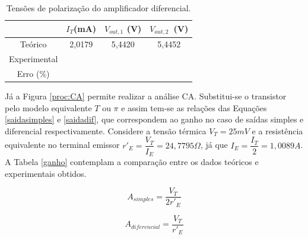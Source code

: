 \documentclass[a4paper,12pt,oneside,openany,table,xcdraw]{article}
\begin{document}
\vspace{0.3cm}
\begin{table} [H]
\centering
\def\arraystretch{1.38}
\caption{Tensões de polarização do amplificador diferencial. } \label{dados}
\begin{tabular}{|c|c|c|c|} 
\hhline{~---|}
\multicolumn{1}{c|}{}                            & {\cellcolor[rgb]{0.937,0.937,0.937}}\textbf{$I_{T}$(mA)} & {\cellcolor[rgb]{0.937,0.937,0.937}}\textbf{$V_{out, 1}$ (V)} & {\cellcolor[rgb]{0.937,0.937,0.937}}\textbf{$V_{out, 2}$~(V)}  \\ 
\hline
{\cellcolor[rgb]{0.937,0.937,0.937}}Teórico      & 2,0179                                                   & 5,4420                                                        & 5,4452                                                         \\ 
\hline
{\cellcolor[rgb]{0.937,0.937,0.937}}Experimental &                                                          &                                                               &                                                                \\ 
\hline
{\cellcolor[rgb]{0.937,0.937,0.937}}Erro (\%)        &                                                          &                                                               &                                                                \\
\hline
\end{tabular}
\end{table}

\vspace{0.3cm}
Já a Figura \ref{proc:CA} permite realizar a análise CA. Substitui-se o transistor pelo modelo equivalente $T$ ou $\pi$ e assim tem-se as relações das Equações \ref{saidasimples} e \ref{saidadif}, que correspondem ao ganho no caso de saídas simples e diferencial respectivamente. Considere a tensão térmica $V_{T}=25 mV$ e a resistência equivalente no terminal emissor $r'_{E}=\dfrac{V_{T}}{I_{E}} = 24,7795 \Omega$, já que $I_{E} = \dfrac{I_{T}}{2} = 1,0089 A$. A Tabela \ref{ganho} contemplam a comparação entre os dados teóricos e experimentais obtidos.

\vspace{0.2cm}
\begin{equation} \label{saidasimples}
A_{simples} = \dfrac{V_{T}}{2 r'_{E}}
\end{equation}

\begin{equation} \label{saidadif}
A_{diferencial} = \dfrac{V_{T}}{r'_{E}}
\end{equation}
\end{document}
